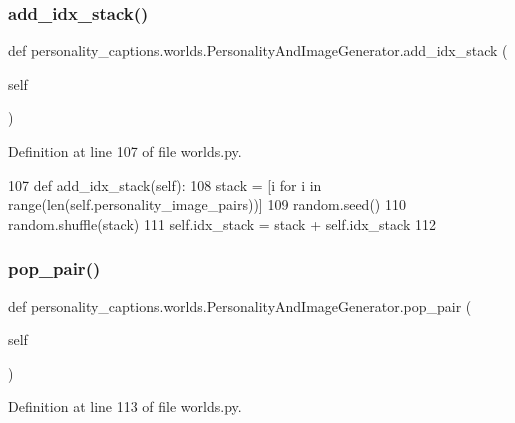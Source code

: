 \subsubsection{\texorpdfstring{add\+\_\+idx\+\_\+stack()}{add\_idx\_stack()}}
{\footnotesize\ttfamily def personality\+\_\+captions.\+worlds.\+Personality\+And\+Image\+Generator.\+add\+\_\+idx\+\_\+stack (\begin{DoxyParamCaption}\item[{}]{self }\end{DoxyParamCaption})}



Definition at line 107 of file worlds.\+py.


\begin{DoxyCode}
107     \textcolor{keyword}{def }add\_idx\_stack(self):
108         stack = [i \textcolor{keywordflow}{for} i \textcolor{keywordflow}{in} range(len(self.personality\_image\_pairs))]
109         random.seed()
110         random.shuffle(stack)
111         self.idx\_stack = stack + self.idx\_stack
112 
\end{DoxyCode}
\mbox{\label{classpersonality__captions_1_1worlds_1_1PersonalityAndImageGenerator_ade0cb023a2efc492a3eedea9c670ef51}} 
\subsubsection{\texorpdfstring{pop\+\_\+pair()}{pop\_pair()}}
{\footnotesize\ttfamily def personality\+\_\+captions.\+worlds.\+Personality\+And\+Image\+Generator.\+pop\+\_\+pair (\begin{DoxyParamCaption}\item[{}]{self }\end{DoxyParamCaption})}



Definition at line 113 of file worlds.\+py.


